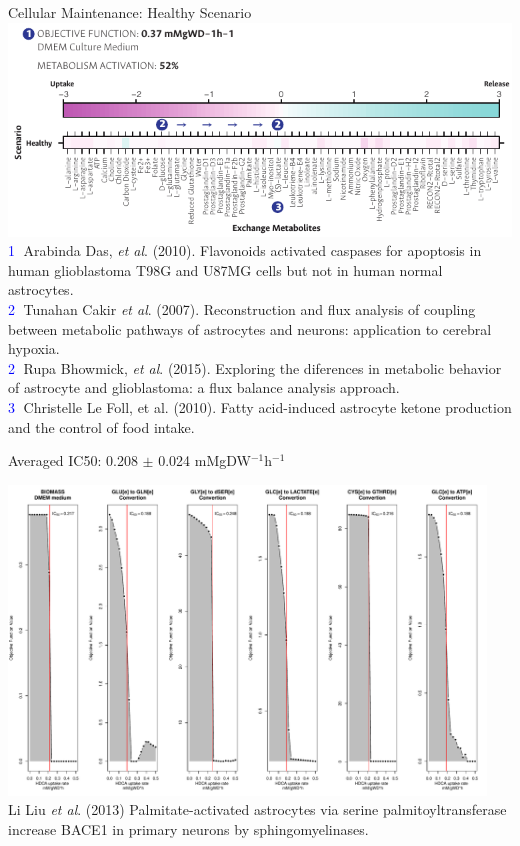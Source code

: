 \documentclass[11pt]{beamer}
\begin{document}
\begin{frame}{Cellular Maintenance: Healthy Scenario}
\includegraphics[width=\textwidth]{H-results}\\
\textcolor{blue}{\textcircled{{\tiny 1}}} {\tiny Arabinda Das, \textit{et al}. (2010). Flavonoids activated caspases for apoptosis in human glioblastoma T98G and U87MG cells but not in human normal astrocytes.\vspace{0.2cm}\\}\pause
\textcolor{blue}{\textcircled{{\tiny 2}}}  {\tiny Tunahan Cakir \textit{et al}. (2007). Reconstruction and flux analysis of coupling between metabolic pathways of astrocytes and neurons: application to cerebral hypoxia.\vspace{0.1cm}\\}
\textcolor{blue}{\textcircled{{\tiny 2}}}  {\tiny Rupa Bhowmick, \textit{et al}. (2015). Exploring the diferences in metabolic behavior of astrocyte and glioblastoma: a flux balance analysis approach.\vspace{0.2cm}\\}
\pause
\textcolor{blue}{\textcircled{{\tiny 3}}}  {\tiny Christelle Le Foll, et al. (2010). Fatty acid-induced astrocyte ketone production and the control of food intake.\\}
\end{frame}
\begin{frame}{Averaged IC50:  0.208 $\pm$ 0.024 mMgDW$^{-1}$h$^{-1}$}
\begin{center}
\includegraphics[width=0.95\textwidth]{IC50}\\
{\tiny Li Liu \textit{et al}. (2013) Palmitate-activated astrocytes via serine palmitoyltransferase increase BACE1 in primary neurons by sphingomyelinases.\\}
\end{center}
\end{frame}
\end{document}
